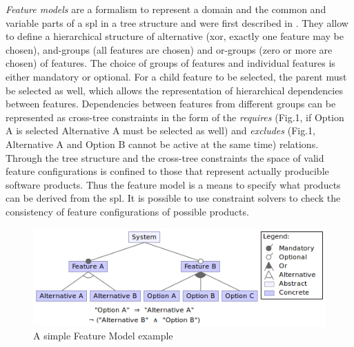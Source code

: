 \textit{Feature models} are a formalism to represent a domain and the common and variable parts of a \gls{spl} in a tree structure and were first described in \cite{Kang1990}. They allow to define a hierarchical structure of alternative (xor, exactly one feature may be chosen), and-groups (all features are chosen) and or-groups (zero or more are chosen) of features. The choice of groups of features and individual features is either mandatory or optional. For a child feature to be selected, the parent must be selected as well, which allows the representation of hierarchical dependencies between features. Dependencies between features from different groups can be represented as cross-tree constraints in the form of the \textit{requires} (Fig.1, if Option A is selected Alternative A must be selected as well) and \textit{excludes} (Fig.1, Alternative A and Option B cannot be active at the same time) relations. Through the tree structure and the cross-tree constraints the space of valid feature configurations is confined to those that represent actually producible software products. Thus the feature model is a means to specify what products can be derived from the \gls{spl}.
It is possible to use constraint solvers to check the consistency of feature configurations of possible products.
\begin{figure}
\centering
\caption{A simple Feature Model example}
\includegraphics[scale=1]{FMexample.png}
\end{figure}


